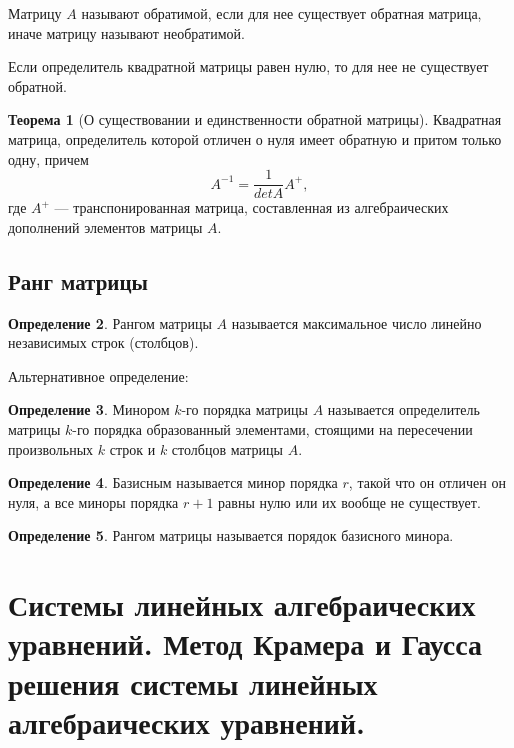 \documentclass[12pt]{report}
\theoremstyle{definition}
\newtheorem{theorem}{Теорема}[chapter]
\newtheorem{definition}[theorem]{Определение}
\begin{document}
Матрицу $A$ называют обратимой, если для нее существует обратная матрица,
иначе матрицу называют необратимой.

Если определитель квадратной матрицы равен нулю, то для нее не существует обратной.

\begin{theorem}[О существовании и единственности обратной матрицы]
Квадратная матрица, определитель которой отличен о нуля имеет обратную и притом только одну,
причем
$$
A^{-1} = \dfrac{1}{det A} A^+,
$$
где $A^+$ --- транспонированная матрица, составленная из алгебраических
дополнений элементов матрицы $A$.
\end{theorem}

\subsection{Ранг матрицы}
\begin{definition}
Рангом матрицы $A$ называется максимальное число линейно независимых строк (столбцов).
\end{definition}

Альтернативное определение:
\begin{definition}
Минором $k$-го порядка матрицы $A$ называется определитель матрицы
$k$-го порядка образованный элементами, стоящими на пересечении произвольных
$k$ строк и $k$ столбцов матрицы $A$.
\end{definition}

\begin{definition}
Базисным называется минор порядка $r$, такой что он отличен он нуля, а все
миноры порядка $r+1$ равны нулю или их вообще не существует.
\end{definition}

\begin{definition}
Рангом матрицы называется порядок базисного минора.
\end{definition}


\section
{
  Системы линейных алгебраических уравнений.
  Метод Крамера и Гаусса решения системы линейных алгебраических уравнений.
}
\end{document}
